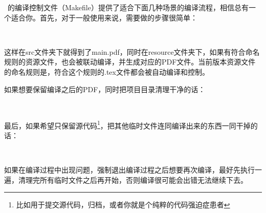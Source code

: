 \dk~的编译控制文件（Makefile）提供了适合下面几种场景的编译流程，相信总有一个适合你。首先，对于一般使用来说，需要做的步骤很简单：

\begin{center}
  ~\faArrowCircleRight~~\faArrowCircleRight~~\faCheckCircle
\end{center}

这样在src文件夹下就得到了main.pdf，同时在resource文件夹下，如果有符合命名规则的资源文件，也会被联动编译，并生成对应的PDF文件。{\dk}当前版本资源文件的命名规则是，符合这个规则的.tex文件都会被自动编译和控制。

如果想要保留编译之后的PDF，同时把项目目录清理干净的话：

\begin{center}
  ~\faArrowCircleRight~~\faArrowCircleRight~~\faArrowCircleRight~~\faCheckCircle
\end{center}

最后，如果希望只保留源代码\footnote{比如用于提交源代码，归档，或者你就是个纯粹的代码强迫症患者{\color{awesome}\faHeart}}，把其他临时文件连同编译出来的东西一同干掉的话：

\begin{center}
  ~\faArrowCircleRight~~\faArrowCircleRight~~\faArrowCircleRight~~\faCheckCircle
\end{center}

\begin{dkcomment}
  如果在编译过程中出现问题，强制退出编译过程之后想要再次编译，最好先执行一遍，清理完所有临时文件之后再开始，否则编译很可能会出错无法继续下去。
\end{dkcomment}


\clearpage
